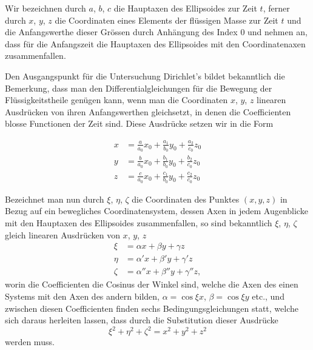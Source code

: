 \documentclass[12pt,a4paper]{book}
\theoremstyle{definition}
\theoremstyle{remark}
\begin{document}
Wir bezeichnen durch $a$, $b$, $c$ die Hauptaxen des Ellipsoides zur Zeit $t$, ferner durch $x$, $y$, $z$ die Coordinaten eines Elements der fl\"ussigen Masse zur Zeit $t$ und die Anfangswerthe dieser Gr\"ossen durch Anh\"angung des Index $0$ und nehmen an, dass f\"ur die Anfangszeit die Hauptaxen des Ellipsoides mit den Coordinatenaxen zusammenfallen.

Den Ausgangspunkt f\"ur die Untersuchung Dirichlet's bildet bekanntlich die Bemerkung, dass man den Differentialgleichungen f\"ur die Bewegung der Fl\"ussigkeitstheile gen\"ugen kann, wenn man die Coordinaten $x$, $y$, $z$ linearen Ausdr\"ucken von ihren Anfangswerthen gleichsetzt, in denen die Coefficienten blosse Functionen der Zeit sind. Diese Ausdr\"ucke setzen wir in die Form

\begin{align*}
x &= \frac{a}{a_{0}}x_{0} + \frac{a_{1}}{b_{0}}y_{0} + \frac{a_{2}}{c_{0}}z_{0}\\
y &= \frac{b}{a_{0}}x_{0} + \frac{b_{1}}{b_{0}}y_{0} + \frac{b_{2}}{c_{0}}z_{0}\\
z &= \frac{c}{a_{0}}x_{0} + \frac{c_{1}}{b_{0}}y_{0} + \frac{c_{2}}{c_{0}}z_{0}\tag{1}
\end{align*}

Bezeichnet man nun durch $\xi$, $\eta$, $\zeta$ die Coordinaten des Punktes $(x,y,z)$ in Bezug auf ein bewegliches Coordinatensystem, dessen Axen in jedem Augenblicke mit den Hauptaxen des Ellipsoides zusammenfallen, so sind bekanntlich $\xi$, $\eta$, $\zeta$ gleich linearen Ausdr\"ucken von $x$, $y$, $z$
\begin{align*}
\xi &= \alpha x + \beta y + \gamma z\\
\eta &= \alpha' x + \beta' y + \gamma' z\\
\zeta &= \alpha'' x + \beta'' y + \gamma'' z,\tag{2}
\end{align*}
worin die Coefficienten die Cosinus der Winkel sind, welche die Axen des einen Systems mit den Axen des andern bilden, $\alpha = \cos\xi x$, $\beta = \cos\xi y$ etc., und zwischen diesen Coefficienten finden sechs Bedingungsgleichungen statt, welche sich daraus herleiten lassen, dass durch die Substitution dieser Ausdr\"ucke
\[
\xi^{2} + \eta^{2} + \zeta^{2} = x^{2} + y^{2} + z^{2}
\]
werden muss.
\end{document}

